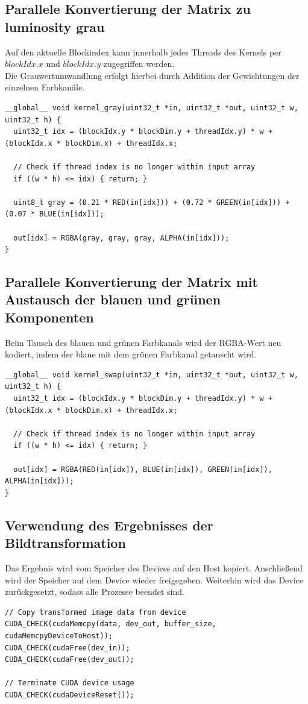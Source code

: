 \documentclass{llncs}
\begin{document}
\subsection{Parallele Konvertierung der Matrix zu luminosity grau}
%

Auf den aktuelle Blockindex kann innerhalb jedes Threads des Kernels per $blockIdx.x$ und $blockIdx.y$ zugegriffen werden.\\
Die Grauwertumwandlung erfolgt hierbei durch Addition der Gewichtungen der einzelnen Farbkanäle. 

\begin{lstlisting}
__global__ void kernel_gray(uint32_t *in, uint32_t *out, uint32_t w, uint32_t h) {
  uint32_t idx = (blockIdx.y * blockDim.y + threadIdx.y) * w + (blockIdx.x * blockDim.x) + threadIdx.x;

  // Check if thread index is no longer within input array
  if ((w * h) <= idx) { return; }

  uint8_t gray = (0.21 * RED(in[idx])) + (0.72 * GREEN(in[idx])) + (0.07 * BLUE(in[idx]));

  out[idx] = RGBA(gray, gray, gray, ALPHA(in[idx]));
}
\end{lstlisting}

%
\subsection{Parallele Konvertierung der Matrix mit Austausch der blauen und grünen Komponenten}
%
Beim Tausch des blauen und grünen Farbkanals wird der RGBA-Wert neu kodiert, indem der blaue mit dem grünen Farbkanal getauscht wird.

\begin{lstlisting}
__global__ void kernel_swap(uint32_t *in, uint32_t *out, uint32_t w, uint32_t h) {
  uint32_t idx = (blockIdx.y * blockDim.y + threadIdx.y) * w + (blockIdx.x * blockDim.x) + threadIdx.x;

  // Check if thread index is no longer within input array
  if ((w * h) <= idx) { return; }

  out[idx] = RGBA(RED(in[idx]), BLUE(in[idx]), GREEN(in[idx]), ALPHA(in[idx]));
}
\end{lstlisting}

\newpage
%
\subsection{Verwendung des Ergebnisses der Bildtransformation}
%
Das Ergebnis wird vom Speicher des Devices auf den Host kopiert. Anschließend wird der Speicher auf dem Device wieder freigegeben. Weiterhin wird das Device zurückgesetzt, sodass alle Prozesse beendet sind.
\begin{lstlisting}
// Copy transformed image data from device
CUDA_CHECK(cudaMemcpy(data, dev_out, buffer_size, cudaMemcpyDeviceToHost));
CUDA_CHECK(cudaFree(dev_in));
CUDA_CHECK(cudaFree(dev_out));

// Terminate CUDA device usage
CUDA_CHECK(cudaDeviceReset());
\end{lstlisting}
\end{document}
